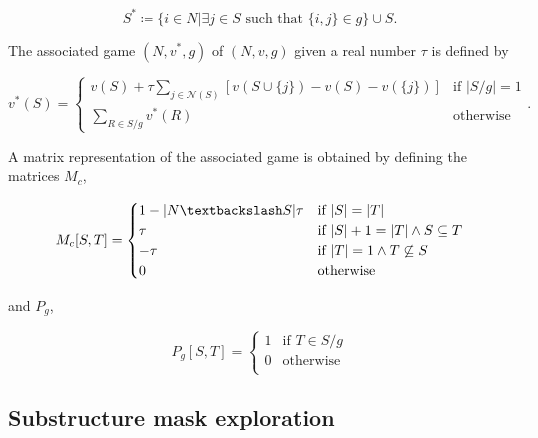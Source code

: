\documentclass[twoside,twocolumn,9pt]{article}
\begin{document}
\begin{equation}
    S^* \coloneqq \{ i \in N | \exists j \in S \text{ such that } \{i, j\} \in g \} \cup S.
\end{equation}

The associated game $(N, v^*, g)$ of $(N, v, g)$ given a real number $\tau$ is defined by 

\begin{equation}
    v^*(S) = 
    \begin{cases}
        v(S) + \tau \sum_{j \in \mathcal{N}(S)} \left[ v(S \cup \{j\}) - v(S) - v(\{j\}) \right]  & \text{if } |S/g| = 1 \\
        \sum_{R \in S/g} v^*(R) &  \text{otherwise}
    \end{cases}
    .
\end{equation}

A matrix representation of the associated game is obtained by defining the matrices $M_c$, 

\begin{equation}
    M_c[S, T] = 
    \begin{cases} 
        1 - |N \textbackslash S| \tau & \text{if } |S| = |T| \\
        \tau & \text{if } |S| + 1 = |T| \land S \subseteq T \\
        -\tau & \text{if } |T| = 1  \land T \not \subseteq S \\
        0 & \text{otherwise}
    \end{cases}
\end{equation}

and $P_g$,

\begin{equation}
    P_g[S, T] = 
    \begin{cases} 
        1 & \text{if } T \in S/g \\
        0 & \text{otherwise} \\
    \end{cases}
\end{equation}

\subsection{Substructure mask exploration}
\end{document}

